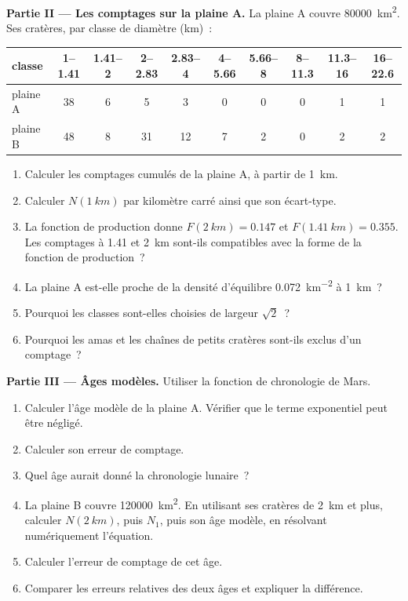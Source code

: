 \begin{problem}
\medskip\noindent\textbf{Partie II --- Les comptages sur la plaine A.} La plaine A
couvre \qty{80000}{km^2}. Ses cratères, par classe de diamètre (km)~:
\begin{center}
\small
\begin{tabular}{lccccccccc}
\hline
classe & 1--1.41 & 1.41--2 & 2--2.83 & 2.83--4 & 4--5.66 & 5.66--8 & 8--11.3 & 11.3--16 & 16--22.6 \\
\hline
plaine A & 38 & 6 & 5 & 3 & 0 & 0 & 0 & 1 & 1 \\
plaine B & 48 & 8 & 31 & 12 & 7 & 2 & 0 & 2 & 2 \\
\hline
\end{tabular}
\end{center}
\begin{enumerate}[resume]
\item Calculer les comptages cumulés de la plaine A, à partir de \qty{1}{km}.
\item Calculer $N(\qty{1}{km})$ par kilomètre carré ainsi que son
  écart-type.
\item La fonction de production donne $F(\qty{2}{km}) = 0.147$ et
  $F(\qty{1.41}{km}) = 0.355$. Les comptages à 1.41 et \qty{2}{km} sont-ils
  compatibles avec la forme de la fonction de production~?
\item La plaine A est-elle proche de la densité d'équilibre
  \qty{0.072}{km^{-2}} à \qty{1}{km}~?
\item Pourquoi les classes sont-elles choisies de largeur $\sqrt2$~?
\item Pourquoi les amas et les chaînes de petits cratères sont-ils exclus d'un comptage~?
\end{enumerate}

\medskip\noindent\textbf{Partie III --- Âges modèles.} Utiliser la
fonction de chronologie de Mars.
\begin{enumerate}[resume]
\item Calculer l'âge modèle de la plaine A. Vérifier que le terme exponentiel
  peut être négligé.
\item Calculer son erreur de comptage.
\item Quel âge aurait donné la chronologie lunaire~?
\item La plaine B couvre \qty{120000}{km^2}. En utilisant ses cratères de
  \qty{2}{km} et plus, calculer $N(\qty{2}{km})$, puis $N_1$, puis son âge modèle,
  en résolvant numériquement l'équation.
\item Calculer l'erreur de comptage de cet âge.
\item Comparer les erreurs relatives des deux âges et expliquer la
  différence.
\end{enumerate}


\end{problem}
